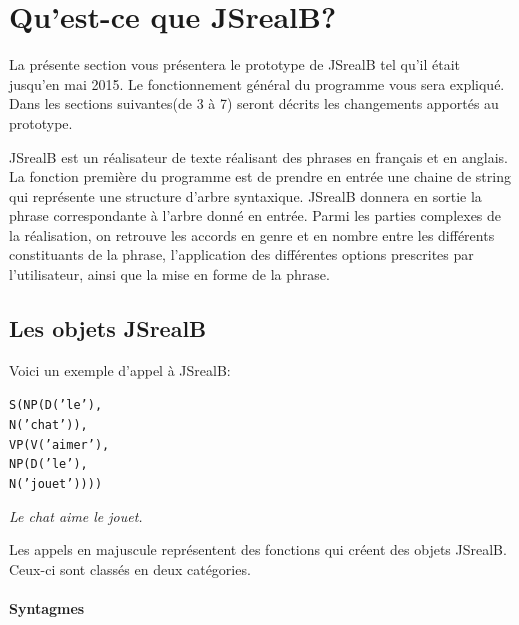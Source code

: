 \documentclass[11pt]{article} %
\newcommand{\system}[1]{\textsf{#1}}
\newcommand{\JSB}{\system{JSrealB}}
\newcommand{\real}[1]{\emph{#1}}
\begin{document}
\section{Qu'est-ce que \JSB{}?}

La présente section vous présentera le prototype de \JSB{} tel qu'il
était jusqu'en mai 2015. Le fonctionnement général du programme vous
sera expliqué. Dans les sections suivantes(de 3 à 7) seront décrits
les changements apportés au prototype.

\JSB{} est un réalisateur de texte réalisant des phrases en français
et en anglais. La fonction première du programme est de prendre en
entrée une chaine de string qui représente une structure d'arbre syntaxique.
\JSB{} donnera en sortie la phrase correspondante à l'arbre donné
en entrée. Parmi les parties complexes de la réalisation, on retrouve
les accords en genre et en nombre entre les différents constituants
de la phrase, l'application des différentes options prescrites par
l'utilisateur, ainsi que la mise en forme de la phrase. 

\subsection{Les objets \JSB{}}

Voici un exemple d'appel à \JSB{}: \newline

\begin{alltt}
S(NP(D('le'),
     N('chat')),
  VP(V('aimer'),
     NP(D('le'),
        N('jouet'))))
\end{alltt}
\real{Le chat aime le jouet.}


Les appels en majuscule représentent des fonctions qui créent des objets \JSB{}. Ceux-ci sont
classés en deux catégories. 

\paragraph{Syntagmes}
\end{document}
